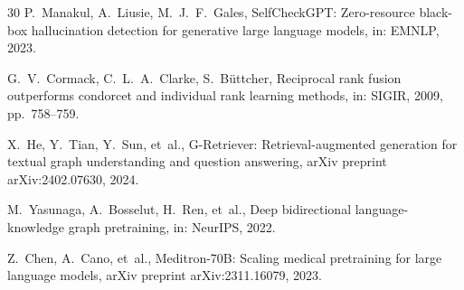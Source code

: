 \documentclass[preprint,12pt]{elsarticle}
\begin{document}
\begin{thebibliography}{30}
P.~Manakul, A.~Liusie, M.~J.~F.~Gales, SelfCheckGPT: Zero-resource black-box hallucination detection for generative large language models, in: EMNLP, 2023.

G.~V.~Cormack, C.~L.~A.~Clarke, S.~B\"uttcher, Reciprocal rank fusion outperforms condorcet and individual rank learning methods, in: SIGIR, 2009, pp.~758--759.

X.~He, Y.~Tian, Y.~Sun, et~al., G-Retriever: Retrieval-augmented generation for textual graph understanding and question answering, arXiv preprint arXiv:2402.07630, 2024.

M.~Yasunaga, A.~Bosselut, H.~Ren, et~al., Deep bidirectional language-knowledge graph pretraining, in: NeurIPS, 2022.

Z.~Chen, A.~Cano, et~al., Meditron-70B: Scaling medical pretraining for large language models, arXiv preprint arXiv:2311.16079, 2023.

\end{thebibliography}
\end{document}
